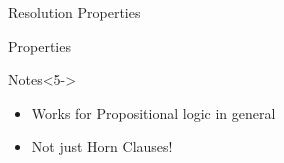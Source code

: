 \documentclass[14pt]{beamer}
\begin{document}
\begin{frame}{Resolution Properties}
\begin{block}{Properties}
\begin{description}[Complete?]
\item[Sound?] 
\item[Complete?] 
\item[Time?] 
\end{description}
\end{block}
\begin{block}{Notes}<5->
\begin{itemize}
\item Works for Propositional logic in general
\item Not just Horn Clauses!
\end{itemize}
\end{block}
\end{frame}
\end{document}
